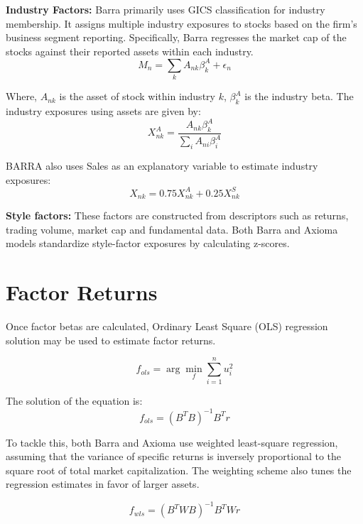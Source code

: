 \documentclass{article}
\begin{document}
\textbf{Industry Factors:}
Barra primarily uses GICS classification for industry membership. It assigns multiple industry exposures to stocks based on the firm’s business segment reporting. Specifically, Barra regresses the market cap of the stocks against their reported assets within each industry.
\begin{equation}
M_n = \sum_{k} A_{nk} \beta^A_k + \epsilon_n
\end{equation}

Where, \( A_{nk} \) is the asset of stock within industry \( k \), \( \beta^A_k \) is the industry beta. The industry exposures using assets are given by:
\begin{equation}
X^A_{nk} = \frac{A_{nk} \beta^A_k}{\sum_i A_{ni} \beta^A_i}
\end{equation}

BARRA also uses Sales as an explanatory variable to estimate industry exposures:
\begin{equation}
X_{nk} = 0.75 X^A_{nk} + 0.25 X^S_{nk}
\end{equation}

\textbf{Style factors:} These factors are constructed from descriptors such as returns, trading volume, market cap and fundamental data. Both Barra and Axioma models standardize style-factor exposures by calculating z-scores.

\section*{Factor Returns}
Once factor betas are calculated, Ordinary Least Square (OLS) regression solution may be used to estimate factor returns.

\begin{equation}
f_{ols} = \arg\min_{f} \sum_{i=1}^{n} u_i^2
\end{equation}

The solution of the equation is:
\begin{equation}
f_{ols} = (B^T B)^{-1} B^T r
\end{equation}

To tackle this, both Barra and Axioma use weighted least-square regression, assuming that the variance of specific returns is inversely proportional to the square root of total market capitalization. The weighting scheme also tunes the regression estimates in favor of larger assets.

\begin{equation}
f_{wls} = (B^T W B)^{-1} B^T W r
\end{equation}
\end{document}
